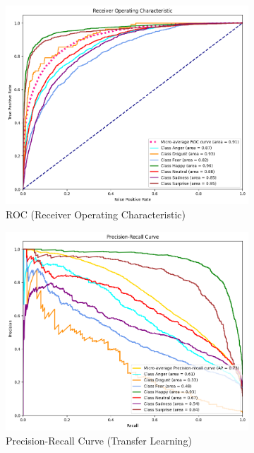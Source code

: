 \documentclass[conference]{IEEEtran}
\begin{document}
\begin{figure}[htbp]
\begin{subfigure}{0.22\textwidth}
        \includegraphics[width=\textwidth]{Figures/ROC - no TL.png}
        \caption{ROC (Receiver Operating Characteristic)}
        \label{fig:roc_notl}
    \end{subfigure}
    \begin{subfigure}{0.22\textwidth}
        \includegraphics[width=\textwidth]{Figures/Precision-recall curve.png}
        \caption{Precision-Recall Curve (Transfer Learning)}
        \label{fig:prec_recall_tl}
    \end{subfigure}
    \begin{subfigure}{0.22\textwidth}

\end{subfigure}
\end{figure}
\end{document}
